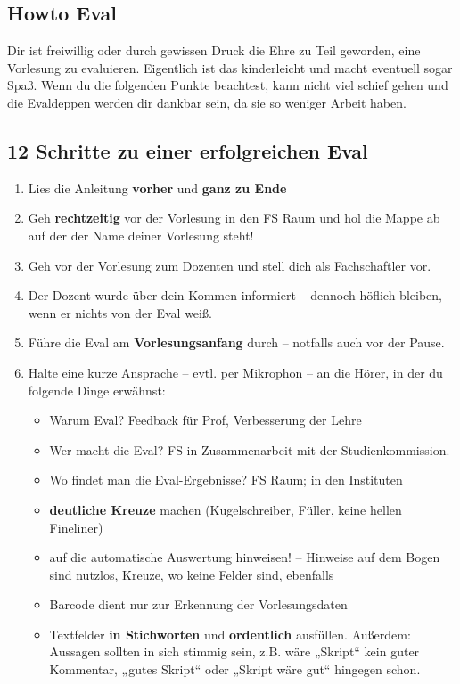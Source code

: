 \documentclass[a4paper,10pt]{article}
\begin{document}
\subsection*{Howto Eval}
Dir ist freiwillig oder durch gewissen Druck die Ehre zu Teil
geworden, eine Vorlesung zu evaluieren. Eigentlich ist das
kinderleicht und macht eventuell sogar Spaß. Wenn du die folgenden
Punkte beachtest, kann nicht viel schief gehen und die Evaldeppen
werden dir dankbar sein, da sie so weniger Arbeit haben.

\subsection*{12 Schritte zu einer erfolgreichen Eval}
\begin{enumerate}
\item Lies die Anleitung \textbf{vorher} und \textbf{ganz zu Ende}
\item Geh \textbf{rechtzeitig} vor der Vorlesung in den FS Raum und hol die
  Mappe ab auf der der Name deiner Vorlesung steht!
\item Geh vor der Vorlesung zum Dozenten und stell dich als
  Fachschaftler vor.
\item Der Dozent wurde über dein Kommen informiert -- dennoch höflich
  bleiben, wenn er nichts von der Eval weiß.
\item Führe die Eval am \textbf{Vorlesungsanfang} durch -- notfalls auch vor der Pause.
\item Halte eine kurze Ansprache -- evtl. per Mikrophon -- an die
  Hörer, in der du folgende Dinge erwähnst:
    \begin{itemize}
    \item Warum Eval? Feedback für Prof, Verbesserung der Lehre
    \item Wer macht die Eval? FS in Zusammenarbeit mit der
          Studienkommission.
    \item Wo findet man die Eval-Ergebnisse? FS Raum; in den
          Instituten
    \item \textbf{deutliche Kreuze} machen (Kugelschreiber, Füller, keine
          hellen Fineliner)
    \item auf die automatische Auswertung hinweisen! -- Hinweise
          auf dem Bogen sind nutzlos, Kreuze, wo keine Felder sind,
          ebenfalls
    \item Barcode dient nur zur Erkennung der Vorlesungsdaten
    \item Textfelder \textbf{in Stichworten} und \textbf{ordentlich} ausfüllen. Außerdem: Aussagen sollten in sich stimmig sein, z.B. wäre „Skript“ kein guter Kommentar, „gutes Skript“ oder „Skript wäre gut“ hingegen schon.

\end{itemize}
\end{enumerate}
\end{document}
